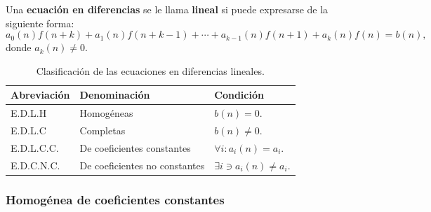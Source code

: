 \begin{frame}
\frametitle{\subsubsecname}

\begin{definition}
Una \textbf{ecuación en diferencias} se le llama \textbf{lineal} si puede expresarse de la siguiente forma:
	\begin{equation}\label{eq:edl}
		a_{0}(n)f\left(n+k\right)+a_{1}(n)f\left(n+k-1\right)+\cdots+a_{k-1}(n)f\left(n+1\right)+a_{k}(n)f\left(n\right)=b\left(n\right), 
	\end{equation}
donde $a_{k}(n)\neq0$.
\end{definition}

\begin{table}
	\caption{Clasificación de las ecuaciones en diferencias lineales.}
	\small
	\begin{tabular}{lll}
		\toprule
		Abreviación										& Denominación									& Condición\\
		\midrule
		\rowcolor{green!40} E.D.L.H		& Homogéneas										& $b(n)=0$.\\
		E.D.L.C												& Completas											& $b(n)\neq0$.\\
		\rowcolor{green!40} E.D.L.C.C.& De coeficientes constantes		& $\forall i: a_{i}(n)=a_{i}$.\\
		E.D.C.N.C.										& De coeficientes no constantes	& $\exists i\ni a_{i}(n)\neq a_{i}$.\\
		\bottomrule
	\end{tabular}
\end{table}

\end{frame}

\subsubsection{Homogénea de coeficientes constantes}

